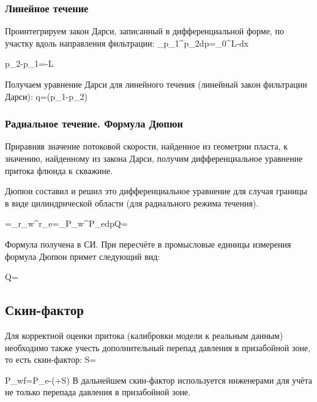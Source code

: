 \documentclass[main.tex]{subfiles}
\begin{document}
\subsubsection{Линейное течение}

Проинтегрируем закон Дарси, записанный в дифференциальной форме, по участку вдоль направления фильтрации:
\beq
\int\limits_{p_1}^{p_2}dp=\int\limits_{0}^{L}-dx
\eeq

\beq
p_2-p_1=-L
\eeq

Получаем уравнение Дарси для линейного течения (линейный закон фильтрации Дарси):
\beq
q=\left(p_1-p_2\right)
\eeq


\subsubsection{Радиальное течение. Формула Дюпюи}

Приравняв значение потоковой скорости, найденное из геометрии пласта, к значению, найденному из закона Дарси, получим дифференциальное уравнение притока флюида к скважине.

Дюпюи составил и решил это дифференциальное уравнение для случая границы в виде цилиндрической области (для радиального режима течения).

\beq
{}=\Rightarrow{}\int\limits_{r_w}^{r_e}{}=\int\limits_{P_w}^{P_e}{dp}\Rightarrow Q=
\eeq

Формула получена в СИ.
При пересчёте в промысловые единицы измерения формула Дюпюи примет следующий вид:

\beq
Q=\,
\eeq


\subsection{Скин-фактор}

Для корректной оценки притока (калибровки модели к реальным данным) необходимо также учесть дополнительный перепад давления в призабойной зоне, то есть скин-фактор:
\beq
S=
\eeq

\beq
P_{wf}=P_e-\left(+S\right)
\eeq
В дальнейшем скин-фактор используется инженерами для учёта не только перепада давления в призабойной зоне.
\end{document}
